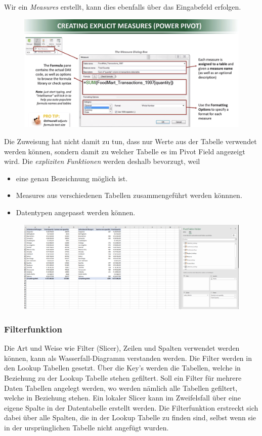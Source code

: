 Wir ein \textit{Measures} erstellt, kann dies ebenfalls über das Eingabefeld erfolgen.
\begin{figure}[H]
	\centering
	\includegraphics[scale = 0.3]{attachment/chapter_1/screenshot085}
	\caption{}
	\label{fig:screenshot085}
\end{figure}
Die Zuweisung hat nicht damit zu tun, dass nur Werte aus der Tabelle verwendet werden können, sondern damit zu welcher Tabelle es im Pivot Field angezeigt wird. 
Die \textit{expliziten Funktionen} werden deshalb bevorzugt, weil
\begin{itemize}
\item eine genau Bezeichnung möglich ist.
\item Measures aus verschiedenen Tabellen zusammengeführt werden könnnen.
\item Datentypen angepasst werden können.
\end{itemize} 

\begin{figure}[H]
	\centering
	\includegraphics[scale = 0.3]{attachment/chapter_1/screenshot086}
	\caption{}
	\label{fig:screenshot086}
\end{figure}

\subsubsection{Filterfunktion}
Die Art und Weise wie Filter (Slicer), Zeilen und Spalten verwendet werden können, kann als Wasserfall-Diagramm verstanden werden. Die Filter werden in den Lookup Tabellen gesetzt. Über die Key's werden die Tabellen, welche in Beziehung zu der Lookup Tabelle stehen gefiltert. Soll ein Filter für mehrere Daten Tabellen angelegt werden, wo werden nämlich alle Tabellen gefiltert, welche in Beziehung stehen. Ein lokaler Slicer kann im Zweifelsfall über eine eigene Spalte in der Datentabelle erstellt werden. Die Filterfunktion erstreckt sich dabei über alle Spalten, die in der Lookup Tabelle zu finden sind, selbst wenn sie in der ursprünglichen Tabelle nicht angefügt wurden.\\

